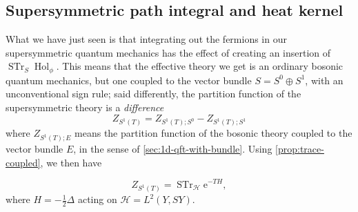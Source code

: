\documentclass[12pt,letterpaper,reqno]{article}
\numberwithin{equation}{section}
\newcommand{\cH}{\ensuremath{\mathcal H}}
\newcommand{\half}{\ensuremath{\frac{1}{2}}}
\newcommand{\dirac}{\slashed{\partial}}
\newcommand{\e}{{\mathrm e}}
\newcommand{\ti}[1]{\textit{#1}}
\DeclareMathOperator{\STr}{STr}
\DeclareMathOperator{\Hol}{Hol}
\newcommand{\fixme}[1]{{\color{orange}{[#1]}}}
\begin{document}



\subsection{Supersymmetric path integral and heat kernel}

What we have just seen is that integrating out the fermions in our supersymmetric
quantum mechanics has the effect of creating an insertion of $\STr_S \Hol_\phi$.
This means that the effective theory we get is an ordinary bosonic quantum mechanics,
but one coupled to the vector bundle $S = S^0 \oplus S^1$, with an unconventional
sign rule; said differently, the partition function of the supersymmetric theory
is a \ti{difference}
\begin{equation}
  Z_{S^1(T)} = Z_{S^1(T);S^0} - Z_{S^1(T);S^1}
\end{equation}
where $Z_{S^1(T);E}$ means the partition function of the bosonic theory coupled to
the vector bundle $E$,
in the sense of \autoref{sec:1d-qft-with-bundle}.
Using \autoref{prop:trace-coupled}, we then have
\begin{prop} 
\begin{equation}
Z_{S^1(T)} = \STr_{\cH} \e^{-TH},
\end{equation}
where $H = -\half \Delta$ acting on $\cH = L^2(Y, SY)$. \fixme{should be careful
about which Laplacian we use here: scalar curvature terms could intervene, but somehow
they don't}
\end{prop}
\end{document}
